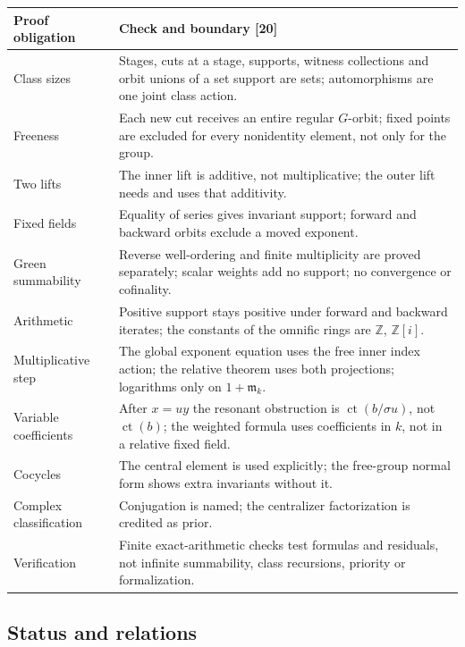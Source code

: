 \documentclass[11pt,oneside]{article}
\numberwithin{equation}{section}
\theoremstyle{definition}
\theoremstyle{remark}
\newcommand{\Z}{\mathbb Z}
\newcommand{\mm}{\mathfrak m}
\newcommand{\ct}{\operatorname{ct}}
\newcommand{\src}[1]{\textup{\textsf{\small[#1]}}}
\begin{document}
\begin{center}
\renewcommand{\arraystretch}{1.15}
\begin{longtable}{>{\raggedright\arraybackslash}p{}>{\raggedright\arraybackslash}p{}}
\toprule
Proof obligation & Check and boundary \src{20}\\
\midrule
\endhead
Class sizes & Stages, cuts at a stage, supports, witness collections and orbit unions of a set support are sets; automorphisms are one joint class
action.\\
Freeness & Each new cut receives an entire regular $G$-orbit; fixed points are excluded for every nonidentity element, not only for the group.\\
Two lifts & The inner lift is additive, not multiplicative; the outer lift needs and uses that additivity.\\
Fixed fields & Equality of series gives invariant support; forward and backward orbits exclude a moved exponent.\\
Green summability & Reverse well-ordering and finite multiplicity are proved separately; scalar weights add no support; no convergence or cofinality.\\
Arithmetic & Positive support stays positive under forward and backward iterates; the constants of the omnific rings are $\Z$, $\Z[i]$.\\
Multiplicative step & The global exponent equation uses the free inner index action; the relative theorem uses both projections; logarithms only on
$1+\mm_k$.\\
Variable coefficients & After $x=uy$ the resonant obstruction is $\ct(b/\sigma u)$, not $\ct(b)$; the weighted formula uses coefficients in $k$, not in a
relative fixed field.\\
Cocycles & The central element is used explicitly; the free-group normal form shows extra invariants without it.\\
Complex classification & Conjugation is named; the centralizer factorization is credited as prior.\\
Verification & Finite exact-arithmetic checks test formulas and residuals, not infinite summability, class recursions, priority or formalization.\\
\bottomrule
\end{longtable}
\end{center}

\subsection{Status and relations}\label{opa:us:sub:status}
\end{document}
